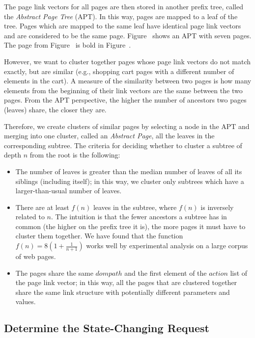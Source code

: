 The page link vectors for all pages are then stored in another prefix tree, called the
\emph{Abstract Page Tree} (APT). In this way, pages are mapped to a leaf of the
tree. Pages which are mapped to the same leaf have identical page link vectors
and are considered to be the same page. Figure~ shows
an APT with seven pages. The page from Figure~ is bold in
Figure~. 

However, we want to cluster together pages whose page link vectors do not match
exactly, but are similar (e.g., shopping cart pages with a different number of
elements in the cart). A measure of the similarity between two pages is how
many elements from the beginning of their link vectors are the same between the
two pages. From the APT perspective, the higher the number of ancestors two
pages (leaves) share, the closer they are.

Therefore, we create clusters of similar pages by selecting a node in the APT
and merging into one cluster, called an \emph{Abstract Page}, all the leaves in
the corresponding subtree. The criteria for deciding whether to cluster a
subtree of depth $n$ from the root is the following:
\begin{itemize}
 \item The number of leaves is greater than the median number of leaves of all
   its siblings (including itself); in this way, we cluster only subtrees which
   have a larger-than-usual number of leaves.
 \item There are at least $f(n)$ leaves in the subtree, where $f(n)$ is
   inversely related to $n$. The intuition is that the fewer ancestors a subtree has in
   common (the higher on the prefix tree it is), the more pages it must have to
   cluster them together. We have found that the function $f(n) =
   8(1+\frac{1}{n+1})$ works well by experimental analysis on a large corpus of
   web pages.

 \item The pages share the same $dompath$ and the first element of the $action$
   list of the page link vector; in this way, all the pages that are clustered
   together share the same link structure with potentially different parameters
   and values.
\end{itemize}

\subsection{Determine the State-Changing Request}

